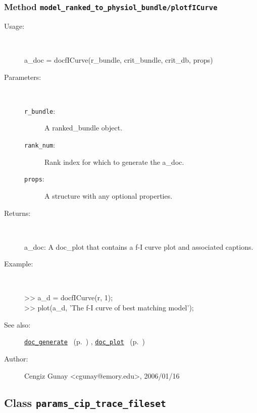 \subsubsection[Method \texttt{plotfICurve}]{Method \texttt{model\_ranked\_to\_physiol\_bundle/plotfICurve}}%
%
\label{ref_model_ranked_to_physiol_bundle__plotfICurve}%
\hypertarget{ref_model_ranked_to_physiol_bundle__plotfICurve}{}%
\begin{description}
%
\item[Usage:]~%
\begin{lyxcode}%
a\_doc = docfICurve(r\_bundle, crit\_bundle, crit\_db, props)
%
\end{lyxcode}%
%
%
\item[Parameters:]~
\begin{description}%
\item[\texttt{r\_bundle}:]
 A ranked\_bundle object.
\item[\texttt{rank\_num}:]
 Rank index for which to generate the a\_doc.
\item[\texttt{props}:]
 A structure with any optional properties.
\end{description}%
%
\item[Returns:
]~

	a\_doc: A doc\_plot that contains a f-I curve plot and associated captions.
%
\item[Example:]~
\begin{lyxcode} >> a\_d = docfICurve(r, 1);
\\%
 >> plot(a\_d, 'The f-I curve of best matching model');
\\%
\end{lyxcode}
%
\item[See also:]%
\hyperlink{ref_doc_generate}{\texttt{doc\_generate}}%
\ (p.~\pageref{ref_doc_generate})%
%
, \hyperlink{ref_doc_plot}{\texttt{doc\_plot}}%
\ (p.~\pageref{ref_doc_plot})%
%
%
\item[Author:]%
Cengiz Gunay <cgunay@emory.edu>, 2006/01/16
%
\end{description}
\methodline%
\subsection{Class \texttt{params\_cip\_trace\_fileset}}%
%
\label{ref_params_cip_trace_fileset}%
\hypertarget{ref_params_cip_trace_fileset}{}%
